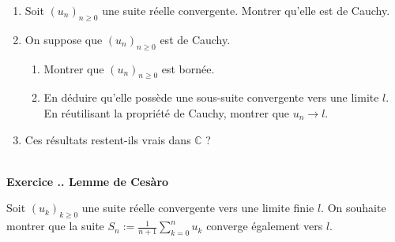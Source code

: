 \documentclass{article}
\newcommand{\mb}[1]{\mathbb{#1}}
\newcounter{exo}
\newcommand{\exercice}[1][\null]{\textbf{\\ Exercice \thesection.\theexo. #1} \addtocounter{exo}{1}}
\begin{document}
\begin{enumerate}

\item Soit $(u_n)_{n \ge 0}$ une suite réelle convergente. Montrer qu'elle est de Cauchy.

\item On suppose que $(u_n)_{n \ge 0}$ est de Cauchy.

\begin{enumerate}

\item Montrer que $(u_n)_{n \ge 0}$ est bornée.

\item En déduire qu'elle possède une sous-suite convergente vers une limite $l$. En réutilisant la propriété de Cauchy, montrer que $u_n \rightarrow l$.

\end{enumerate}

\item Ces résultats restent-ils vrais dans $\mb{C}$ ?

\end{enumerate}






\exercice[Lemme de Ces\`aro]

Soit $(u_k)_{k \ge 0}$ une suite réelle convergente vers une limite finie $l$. On souhaite montrer que la suite $\displaystyle S_n := \frac{1}{n+1} \sum_{k=0}^n u_k $ converge également vers $l$.
\end{document}

